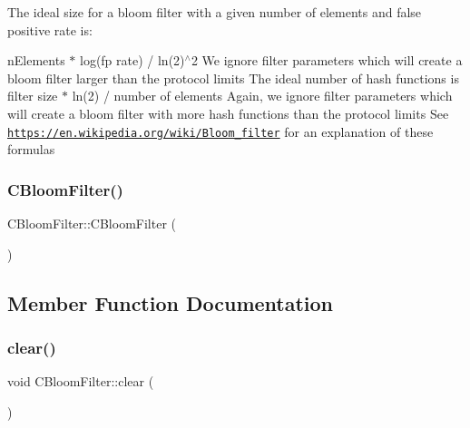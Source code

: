 The ideal size for a bloom filter with a given number of elements and false positive rate is\+:
\begin{DoxyItemize}
\item n\+Elements $\ast$ log(fp rate) / ln(2)$^\wedge$2 We ignore filter parameters which will create a bloom filter larger than the protocol limits The ideal number of hash functions is filter size $\ast$ ln(2) / number of elements Again, we ignore filter parameters which will create a bloom filter with more hash functions than the protocol limits See \href{https://en.wikipedia.org/wiki/Bloom_filter}{\tt https\+://en.\+wikipedia.\+org/wiki/\+Bloom\+\_\+filter} for an explanation of these formulas 
\end{DoxyItemize}\mbox{\label{class_c_bloom_filter_ab38a984b1020bc4afd85c06e90353b28}} 
\subsubsection{\texorpdfstring{C\+Bloom\+Filter()}{CBloomFilter()}\hspace{0.1cm}{\footnotesize\ttfamily [3/3]}}
{\footnotesize\ttfamily C\+Bloom\+Filter\+::\+C\+Bloom\+Filter (\begin{DoxyParamCaption}{ }\end{DoxyParamCaption})\hspace{0.3cm}{\ttfamily [inline]}}



\subsection{Member Function Documentation}
\mbox{\label{class_c_bloom_filter_abf30228c0b24c57530f6b6734cd40252}} 
\subsubsection{\texorpdfstring{clear()}{clear()}}
{\footnotesize\ttfamily void C\+Bloom\+Filter\+::clear (\begin{DoxyParamCaption}{ }\end{DoxyParamCaption})}

